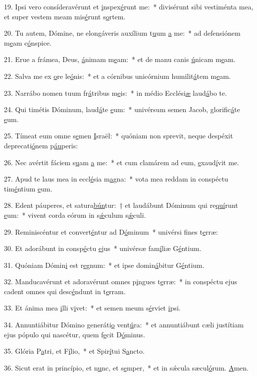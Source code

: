 19. Ipsi vero consíderavérunt et \uline{i}nspex\uline{é}runt me:~* divisérunt sibi vestiménta mea, et super vestem meam mis\uline{é}runt s\uline{o}rtem.\par 
20. Tu autem, Dómine, ne elongáveris auxílium t\uline{u}um \uline{a} me:~* ad defensiónem m\uline{e}am c\uline{ó}nspice.\par 
21. Erue a frámea, Deus, \uline{á}nimam m\uline{e}am:~* et de manu canis \uline{ú}nicam m\uline{e}am.\par 
22. Salva me ex \uline{o}re le\uline{ó}nis:~* et a córnibus unicórnium humilit\uline{á}tem m\uline{e}am.\par 
23. Narrábo nomen tuum fr\uline{á}tribus m\uline{e}is:~* in médio Ecclési\uline{æ} laud\uline{á}bo te.\par 
24. Qui timétis Dóminum, laud\uline{á}te \uline{e}um:~* univérsum semen Jacob, glorific\uline{á}te \uline{e}um.\par 
25. Tímeat eum omne s\uline{e}men \uline{I}sraël:~* quóniam non sprevit, neque despéxit deprecati\uline{ó}nem p\uline{áu}peris:\par 
26. Nec avértit fáciem s\uline{u}am \uline{a} me:~* et cum clamárem ad eum, \uline{e}xaud\uline{í}vit me.\par 
27. Apud te laus mea in eccl\uline{é}sia m\uline{a}gna:~* vota mea reddam in conspéctu tim\uline{é}ntium \uline{e}um.\par 
28. Edent páuperes, et satura\uline{bún}tur:~† et laudábunt Dóminum qui re\uline{quí}runt \uline{e}um:~* vivent corda eórum in s\uline{ǽ}culum s\uline{ǽ}culi.\par 
29. Reminiscéntur et convert\uline{é}ntur ad D\uline{ó}minum~* univérsi f\uline{i}nes t\uline{e}rræ:\par 
30. Et adorábunt in consp\uline{é}ctu \uline{e}jus~* univérsæ fam\uline{í}liæ G\uline{é}ntium.\par 
31. Quóniam Dómin\uline{i} est r\uline{e}gnum:~* et ipse domin\uline{á}bitur G\uline{é}ntium.\par 
32. Manducavérunt et adoravérunt omnes p\uline{i}ngues t\uline{e}rræ:~* in conspéctu ejus cadent omnes qui desc\uline{é}ndunt in t\uline{e}rram.\par 
33. Et ánima mea \uline{i}lli v\uline{i}vet:~* et semen meum s\uline{é}rviet \uline{i}psi.\par 
34. Annuntiábitur Dómino generáti\uline{o} vent\uline{ú}ra:~* et annuntiábunt cæli justítiam ejus pópulo qui nascétur, quem f\uline{e}cit D\uline{ó}minus.\par 
35. Glória P\uline{a}tri, et F\uline{í}lio,~* et Spir\uline{í}tui S\uline{a}ncto.\par 
36. Sicut erat in princípio, et n\uline{u}nc, et s\uline{e}mper,~* et in sǽcula sæcul\uline{ó}rum. \uline{A}men.\par 
